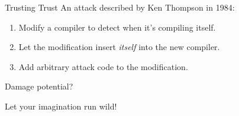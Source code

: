 \documentclass[12pt]{beamer}
\begin{document}
  \begin{frame}{Trusting Trust}
    An attack described by Ken Thompson in 1984:

    \begin{enumerate}
    \item Modify a compiler to detect when it's compiling itself.
    \item Let the modification insert \textit{itself} into the new compiler.
    \item Add arbitrary attack code to the modification.
    \end{enumerate}
  \end{frame}

  \begin{frame}{Damage potential?}
    \begin{center}
      Let your imagination run wild!
    \end{center}
  \end{frame}
\end{document}
